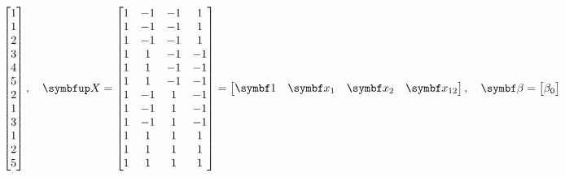 \begin{itemize}
\begin{itemize}
\[\begin{bmatrix}
                                    1 \\
                                    1 \\
                                    2 \\
                                    3 \\
                                    4 \\
                                    5 \\
                                    2 \\
                                    1 \\
                                    3 \\
                                    1 \\
                                    2 \\
                                    5
                              \end{bmatrix},\quad\Matrix{X}=\begin{bmatrix}
                                    1 & -1 & -1 & 1  \\
                                    1 & -1 & -1 & 1  \\
                                    1 & -1 & -1 & 1  \\
                                    1 & 1  & -1 & -1 \\
                                    1 & 1  & -1 & -1 \\
                                    1 & 1  & -1 & -1 \\
                                    1 & -1 & 1  & -1 \\
                                    1 & -1 & 1  & -1 \\
                                    1 & -1 & 1  & -1 \\
                                    1 & 1  & 1  & 1  \\
                                    1 & 1  & 1  & 1  \\
                                    1 & 1  & 1  & 1
                              \end{bmatrix}=\begin{bmatrix}
                                    \Vector{1} & \Vector{x}_1 & \Vector{x}_2 & \Vector{x}_{12}
                              \end{bmatrix},\quad\Vector{\beta}=\begin{bmatrix}
                                    \beta_0 \\

\end{bmatrix}\]
\end{itemize}
\end{itemize}
